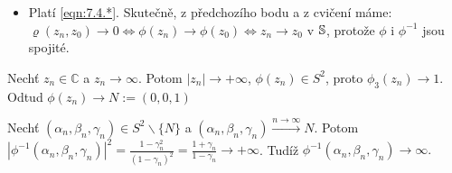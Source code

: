 \begin{properties}
\begin{itemize}
    \item Platí \cref{eqn:7.4.*}. Skutečně, z předchozího bodu a z cvičení máme: $\varrho(z_n,z_0)\rightarrow0\Leftrightarrow\phi(z_n)\rightarrow\phi(z_0)\Leftrightarrow z_n\rightarrow z_0$ v $\operatorname{\mathbb{S}}$, protože $\phi$ i $\phi^{-1}$ jsou spojité.
    \end{itemize}
     \begin{example}
     Nechť $z_n\in \mathbb{C}$ a $z_n\rightarrow \infty$. Potom $|z_n|\rightarrow+\infty$, $\phi(z_n)\in S^2$, proto  $\phi_3(z_n)\rightarrow 1$. Odtud $\phi(z_n)\rightarrow N:=(0,0,1)$
     \end{example}
     \begin{example}
     Nechť $(\alpha_n,\beta_n,\gamma_n)\in S^2\smallsetminus\{N\}$ a $(\alpha_n,\beta_n,\gamma_n)\overset{n\to\infty}{\longrightarrow} N$. Potom
     $|\phi^{-1}(\alpha_n,\beta_n,\gamma_n)|^2=\frac{1-\gamma_n^2}{(1-\gamma_n)^2}=\frac{1+\gamma_n}{1-\gamma_n}\rightarrow+\infty$. Tudíž $\phi^{-1}(\alpha_n,\beta_n,\gamma_n)\rightarrow\infty.$
     \end{example}

\end{properties}
